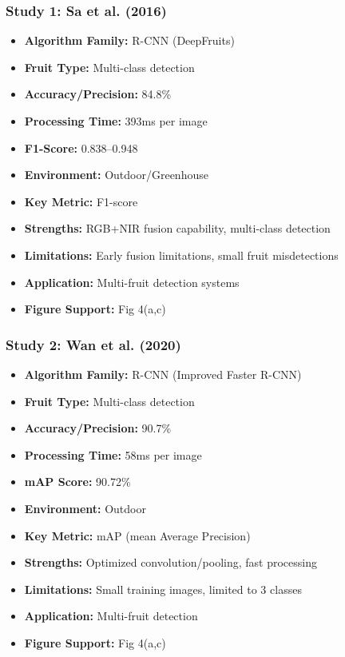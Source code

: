\documentclass[11pt]{article}
\begin{document}
\subsubsection{Study 1: Sa et al. (2016) \cite{sa2016deepfruits}}
\begin{itemize}
    \item \textbf{Algorithm Family:} R-CNN (DeepFruits)
    \item \textbf{Fruit Type:} Multi-class detection
    \item \textbf{Accuracy/Precision:} 84.8\%
    \item \textbf{Processing Time:} 393ms per image
    \item \textbf{F1-Score:} 0.838--0.948
    \item \textbf{Environment:} Outdoor/Greenhouse
    \item \textbf{Key Metric:} F1-score
    \item \textbf{Strengths:} RGB+NIR fusion capability, multi-class detection
    \item \textbf{Limitations:} Early fusion limitations, small fruit misdetections
    \item \textbf{Application:} Multi-fruit detection systems
    \item \textbf{Figure Support:} Fig 4(a,c)
\end{itemize}

\subsubsection{Study 2: Wan et al. (2020) \cite{wan2020faster}}
\begin{itemize}
    \item \textbf{Algorithm Family:} R-CNN (Improved Faster R-CNN)
    \item \textbf{Fruit Type:} Multi-class detection
    \item \textbf{Accuracy/Precision:} 90.7\%
    \item \textbf{Processing Time:} 58ms per image
    \item \textbf{mAP Score:} 90.72\%
    \item \textbf{Environment:} Outdoor
    \item \textbf{Key Metric:} mAP (mean Average Precision)
    \item \textbf{Strengths:} Optimized convolution/pooling, fast processing
    \item \textbf{Limitations:} Small training images, limited to 3 classes
    \item \textbf{Application:} Multi-fruit detection
    \item \textbf{Figure Support:} Fig 4(a,c)
\end{itemize}
\end{document}
